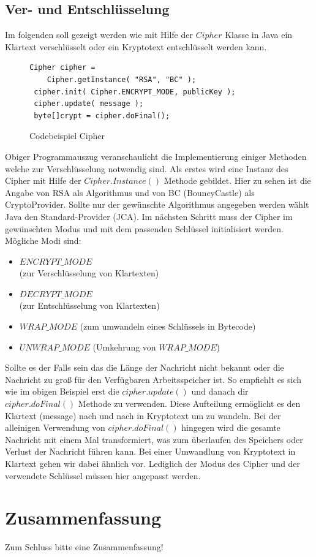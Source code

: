 \documentclass[paper=a4,11pt,german]{scrartcl} %
\begin{document}
\subsection{Ver- und Entschlüsselung}
Im folgenden soll gezeigt werden wie mit Hilfe der $Cipher$ Klasse in Java ein Klartext verschlüsselt oder ein Kryptotext entschlüsselt werden kann.
\begin{figure}[h]
\caption{Codebeispiel Cipher}
\begin{lstlisting}[frame=shadowbox]
 Cipher cipher = 
 	Cipher.getInstance( "RSA", "BC" );
 cipher.init( Cipher.ENCRYPT_MODE, publicKey );
 cipher.update( message );
 byte[]crypt = cipher.doFinal();
\end{lstlisting}
\label{encrypt}
\end{figure}
Obiger Programmauszug veranschaulicht die Implementierung einiger Methoden welche zur Verschlüsselung notwendig sind. Als erstes wird eine Instanz des Cipher mit Hilfe der $Cipher.Instance()$ Methode gebildet. Hier zu sehen ist die Angabe von RSA als Algorithmus und von BC (BouncyCastle) als CryptoProvider. Sollte nur der gewünschte Algorithmus angegeben werden wählt Java den Standard-Provider (JCA). Im nächsten Schritt muss der Cipher im gewünschten Modus und mit dem passenden Schlüssel initialisiert werden.\\
Mögliche Modi sind:
\begin{itemize}
\item $ENCRYPT\_MODE$\\(zur Verschlüsselung von Klartexten)
\item  $DECRYPT\_MODE$\\
(zur Entschlüsselung von Klartexten)
\item $WRAP\_MODE$
(zum umwandeln eines Schlüssels in Bytecode)
\item $UNWRAP\_MODE$
(Umkehrung von $WRAP\_MODE$)
\end{itemize}
Sollte es der Falls sein das die Länge der Nachricht nicht bekannt oder die Nachricht zu groß für den Verfügbaren Arbeitsspeicher ist. So empfiehlt es sich wie im obigen Beispiel erst die $cipher.update()$ und danach dir $cipher.doFinal()$ Methode zu verwenden. Diese Aufteilung ermöglicht es den Klartext (message) nach und nach in Kryptotext um zu wandeln. Bei der alleinigen Verwendung von $cipher.doFinal()$ hingegen wird die gesamte Nachricht mit einem Mal transformiert, was zum überlaufen des Speichers oder Verlust der Nachricht führen kann.
Bei einer Umwandlung von Kryptotext in Klartext gehen wir dabei ähnlich vor. Lediglich der Modus des Cipher und der verwendete Schlüssel müssen hier angepasst werden.  
\section{Zusammenfassung}
Zum Schluss bitte eine Zusammenfassung!



\end{document}
